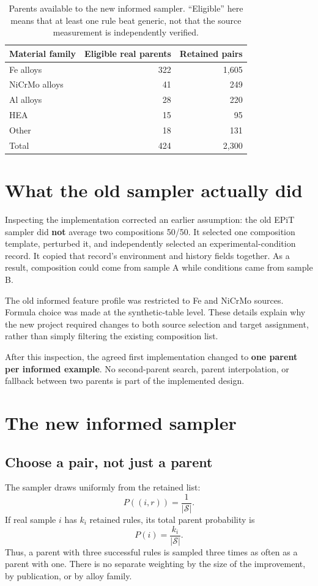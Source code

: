 \documentclass[11pt]{article}
\begin{document}
\begin{table}[htbp]
\centering
\begin{tabular}{lrr}
\toprule
Material family & Eligible real parents & Retained pairs \\
\midrule
Fe alloys & 322 & 1,605 \\
NiCrMo alloys & 41 & 249 \\
Al alloys & 28 & 220 \\
HEA & 15 & 95 \\
Other & 18 & 131 \\
\midrule
Total & 424 & 2,300 \\
\bottomrule
\end{tabular}
\caption{Parents available to the new informed sampler. ``Eligible'' here means
that at least one rule beat generic, not that the source measurement is independently verified.}
\end{table}

\section{What the old sampler actually did}
Inspecting the implementation corrected an earlier assumption: the old EPiT
sampler did \textbf{not} average two compositions 50/50.
It selected one composition template, perturbed it, and independently selected
an experimental-condition record. It copied that record's environment and
history fields together. As a result, composition could come from sample A
while conditions came from sample B.

The old informed feature profile was restricted to Fe and NiCrMo sources.
Formula choice was made at the synthetic-table level. These details explain why
the new project required changes to both source selection and target assignment,
rather than simply filtering the existing composition list.

After this inspection, the agreed first implementation changed to
\textbf{one parent per informed example}. No second-parent search, parent
interpolation, or fallback between two parents is part of the implemented design.

\section{The new informed sampler}
\subsection{Choose a pair, not just a parent}
The sampler draws uniformly from the retained list:
\begin{equation}
 P((i,r))=\frac{1}{|\mathcal{S}|}.
\end{equation}
If real sample $i$ has $k_i$ retained rules, its total parent probability is
\begin{equation}
 P(i)=\frac{k_i}{|\mathcal{S}|}.
\end{equation}
Thus, a parent with three successful rules is sampled three times as often as a
parent with one. There is no separate weighting by the size of the improvement,
by publication, or by alloy family.
\end{document}
